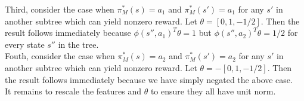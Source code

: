 \documentclass[11pt,twoside]{article}
\begin{document}
\noindent Third, consider the case when $\pi_M^*(s) = a_1$ and $\pi_M^*(s') = a_1$ for any $s'$ in another subtree which can yield nonzero reward. Let $\theta = [0, 1, -1/2]$. Then the result follows immediately because $\phi(s'', a_1)^T\theta = 1$ but $\phi(s'', a_2)^T\theta = 1/2$ for every state $s''$ in the tree. \\

\noindent Fouth, consider the case when $\pi_M^*(s) = a_2$ and $\pi_M^*(s') = a_2$ for any $s'$ in another subtree which can yield nonzero reward. Let $\theta = -[0, 1, -1/2]$. Then the result follows immediately because we have simply negated the above case. \\

\noindent It remains to rescale the features and $\theta$ to ensure they all have unit norm. \\
\end{document}
